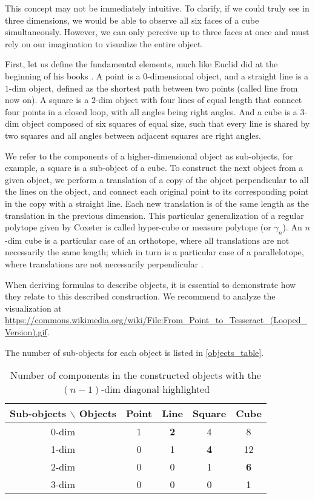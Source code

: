\documentclass{article}
\begin{document}
	This concept may not be immediately intuitive. To clarify, if we could truly see in three dimensions, we would be able to observe all six faces of a cube simultaneously. However, we can only perceive up to three faces at once and must rely on our imagination to visualize the entire object.
	
	First, let us define the fundamental elements, much like Euclid did at the beginning of his books \cite{euclid}. A point is a $0$-dimensional object, and a straight line is a $1$-dim object, defined as the shortest path between two points (called line from now on). A square is a $2$-dim object with four lines of equal length that connect four points in a closed loop, with all angles being right angles. And a cube is a $3$-dim object composed of six squares of equal size, such that every line is shared by two squares and all angles between adjacent squares are right angles.

	We refer to the components of a higher-dimensional object as sub-objects, for example, a square is a sub-object of a cube. To construct the next object from a given object, we perform a translation of a copy of the object perpendicular to all the lines on the object, and connect each original point to its corresponding point in the copy with a straight line. Each new translation is of the same length as the translation in the previous dimension. This particular generalization of a regular polytope given by Coxeter \cite{coxeter1973regular} is called hyper-cube or measure polytope (or $\gamma_n$). An $n$-dim cube is a particular case of an orthotope, where all translations are not necessarily the same length; which in turn is a particular case of a parallelotope, where translations are not necessarily perpendicular \cite{coxeter1973regular}.
	
	When deriving formulas to describe objects, it is essential to demonstrate how they relate to this described construction. We recommend to analyze the visualization at \url{https://commons.wikimedia.org/wiki/File:From_Point_to_Tesseract_(Looped_Version).gif}.
	
	The number of sub-objects for each object is listed in \autoref{objects_table}.

	\begin{table}[ht]
		\centering
		\begin{tabular}{||c | c c c c||}
			\hline
			Sub-objects $\backslash$ Objects & Point & Line & Square & Cube\\\hline\hline
			0-dim & 1 & \textbf{2} & 4 & 8\\\hline
			1-dim & 0 & 1 & \textbf{4} & 12\\\hline
			2-dim & 0 & 0 & 1 & \textbf{6}\\\hline
			3-dim & 0 & 0 & 0 & 1\\\hline
		\end{tabular}
		\caption{Number of components in the constructed objects with the $(n-1)$-dim diagonal highlighted \cite{coxeter1973regular}}
		\label{objects_table}
	\end{table}
	
\end{document}
